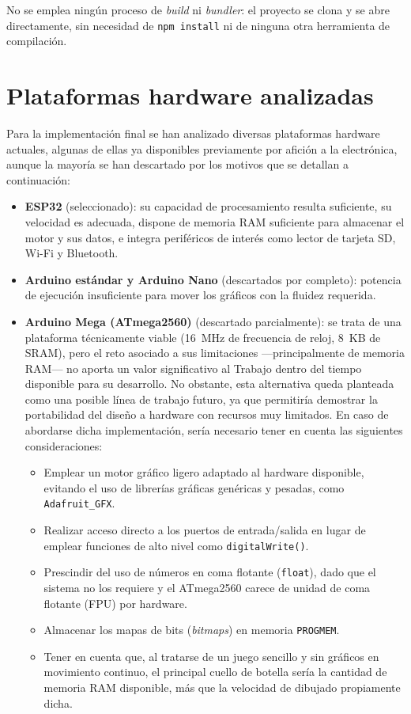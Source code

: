 \documentclass[../main.tex]{subfiles}
\begin{document}
No se emplea ningún proceso de \emph{build} ni \emph{bundler}: el proyecto se clona y se abre directamente, sin necesidad de \texttt{npm install} ni de ninguna otra herramienta de compilación.

	\section{Plataformas hardware analizadas}
	\label{sec:plataformas-analizadas}

	Para la implementación final se han analizado diversas plataformas hardware actuales, algunas de ellas ya disponibles previamente por afición a la electrónica, aunque la mayoría se han descartado por los motivos que se detallan a continuación:

	\begin{itemize}
		\item \textbf{ESP32} (seleccionado): su capacidad de procesamiento resulta suficiente, su velocidad es adecuada, dispone de memoria RAM suficiente para almacenar el motor y sus datos, e integra periféricos de interés como lector de tarjeta SD, Wi-Fi y Bluetooth.

		\item \textbf{Arduino estándar y Arduino Nano} (descartados por completo): potencia de ejecución insuficiente para mover los gráficos con la fluidez requerida.

		\item \textbf{Arduino Mega (ATmega2560)} (descartado parcialmente): se trata de una plataforma técnicamente viable (16~MHz de frecuencia de reloj, 8~KB de SRAM), pero el reto asociado a sus limitaciones —principalmente de memoria RAM— no aporta un valor significativo al Trabajo dentro del tiempo disponible para su desarrollo. No obstante, esta alternativa queda planteada como una posible línea de trabajo futuro, ya que permitiría demostrar la portabilidad del diseño a hardware con recursos muy limitados. En caso de abordarse dicha implementación, sería necesario tener en cuenta las siguientes consideraciones:
		\begin{itemize}
			\item Emplear un motor gráfico ligero adaptado al hardware disponible, evitando el uso de librerías gráficas genéricas y pesadas, como \texttt{Adafruit\_GFX}.
			\item Realizar acceso directo a los puertos de entrada/salida en lugar de emplear funciones de alto nivel como \texttt{digitalWrite()}.
			\item Prescindir del uso de números en coma flotante (\texttt{float}), dado que el sistema no los requiere y el ATmega2560 carece de unidad de coma flotante (FPU) por hardware.
			\item Almacenar los mapas de bits (\textit{bitmaps}) en memoria \texttt{PROGMEM}.
			\item Tener en cuenta que, al tratarse de un juego sencillo y sin gráficos en movimiento continuo, el principal cuello de botella sería la cantidad de memoria RAM disponible, más que la velocidad de dibujado propiamente dicha.
		\end{itemize}


\end{itemize}
\end{document}
